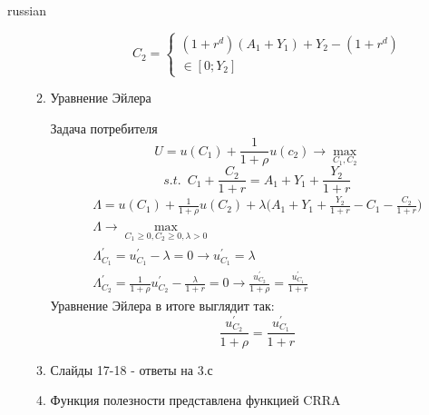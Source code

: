 \documentclass{article}
\begin{document}
\begin{otherlanguage*}{russian}
\begin{enumerate}
\begin{enumerate}
\begin{enumerate}
\begin{equation}
C_2 = \begin{cases} 
(1 + r^d) (A_1 + Y_1) + Y_2 - (1 + r^d) \\
\in [0; Y_2] 
\end{cases}
\end{equation}
\end{enumerate}
\item Уравнение Эйлера

Задача потребителя
\begin{equation}
U = u(C_1) + \frac{1}{1 + \rho} u(c_2) \rightarrow \max_{C_1, C_2} 
\end{equation}
\begin{equation}
s.t. \,\,\, C_1 + \frac{C_2}{1 + r} = A_1 + Y_1 + \frac{Y_2}{1 + r}
\end{equation}
\begin{align}
\Lambda = u(C_1) + \frac{1}{1 + \rho} u(C_2) + \lambda \Big( A_1 + Y_1 + \frac{Y_2}{1 + r} - C_1 - \frac{C_2}{1 + r}\Big) \\ 
\Lambda \rightarrow \max_{C_1 \ge 0, C_2 \ge 0, \lambda > 0} \\
\Lambda^{'}_{C_1} = u^{'}_{C_1} - \lambda = 0 \rightarrow u^{'}_{C_1} = \lambda \\
\Lambda^{'}_{C_2} =\frac{1}{1 + \rho}  u^{'}_{C_2} - \frac{\lambda}{1 + r} = 0 \rightarrow \frac{u^{'}_{C_2}}{1 + \rho} = \frac{u^{'}_{C_1}}{1 + r} 
\end{align}
Уравнение Эйлера в итоге выглядит так: 
\begin{equation}
 \frac{u^{'}_{C_2}}{1 + \rho} = \frac{u^{'}_{C_1}}{1 + r} 
\end{equation}
\item Слайды 17-18 - ответы на 3.с
\item Функция полезности представлена функцией CRRA 


\end{enumerate}
\end{enumerate}
\end{otherlanguage*}
\end{document}
